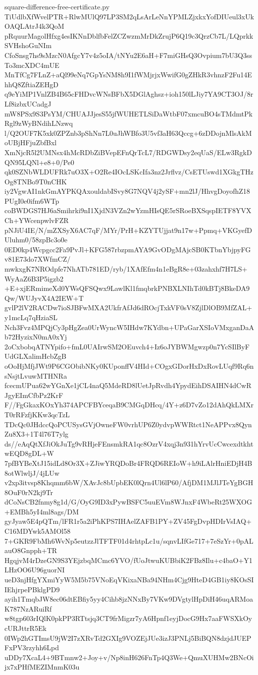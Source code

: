 \documentclass[11pt]{article}
\theoremstyle{definition}
\theoremstyle{remark}
\begin{document}
\begin{filecontents*}[overwrite]{square-difference-free-certificate.py}
TiUdlbXfWvelPTR+RlwMUlQ97LP3SM2qLsArLeNnYPMLZjxkxYofDIUeul3xUkOAQLAtrJ4k3QoM
pRquurMagolHfxg4esIKNnDblfbFelZCZwzmMrDkZrujP6Q19c3QrzCb7L/LQprkkSVHshoGuNIm
CfoSnsg7hs9sMzcN0AfgcY7v4z5oIA/tNYu2E6aH+F7miGHsQ3Ovpium7bU3Q3ssTo3mcXDC4mUE
MnTfCg7FLnZ+aQl99eNq7GpYsNM8h9I1fWMjrjxWwifG0gZHkR3vhnzF2Fu14EhhQ8ZftiaZEHgD
q9eYiMP1VnlZB4B65cFHDvcWNsBFbX5DGlAghsz+ioh150lLJiy7YA9CT3OJ/8rLf8izbxUCadgJ
mW8PSx9S3PsYM/CHUAJJjesS55jfWUHETLSiDaWtbF07xmcuBO4sTMdmtPkRgl9zWyBNdihLNzwq
l/Q2OUF7K5xk0ZPZnb3pShNn7L0uJhWBfo3U5vf3aH63Qccg+6zDDojnMlsAkMoUBjHFjuZbfBxl
XmNjcR5l2UMNsx4hMcRDbZiBVepEFnQrTcL7/RDGWDsy2eqUaS/ELw3RgkDQN95LQNl+e8+0/Pe0
qk0SZNbWLDUFRk7uO3X+O2Re4IOcLSKcIfa3nz2Jrflvz/CsETUswd1XGkgTHzOg8TNBo9T0nCHK
iy2VgwAI1nkGmAYPKQAxouldabISvy8G7NQV4j2ySF+mn2lJ/HhvgDoyofhZ18PUgI0e0ifm6WTp
coBWDGS7HJ6aSmihrki9nI1XjdN3VZn2wYzmHIsQE5rSRoeBXSqspIETF8YVXCh+YWcenpwlvFZR
pNJiU4IE/N/mZXSyX6AC7qF/MYr/PrH+KZYTUjjat9n17w+Ppmq+VKGyefDUluhm0/58zpBc3o0e
0ED0kp4Wcpgcc2Fa9PvJl+KFG587rbzpmAYA9GvODgMAjcSB0KTbnYbjpyFGv81E73do7XWfmCZ/
mwkxgK7NROdpfe7NhATb781ED/ryb/1XAfEfm4n1eBgR8e+03zahxhf7H7LS+WyAaZ6B3P5igzb2
+E+xjERmimeXd0YWsQFSQwx9LawlKl1fmqbrkPNBXLNIhTd0kBTj8BkeDA9Qw/WUJyvX4A2IEW+T
gvlP2lV2RACDw7ioSJBFwMXA2UkfrAfJd6dROcjTxkVF0sV8ZjlDlOB9MfZAL+y1mcLq7qHziaSL
Nch3Fvz4MPQjCy3pHgZea0UrWyncW5IHdw7KYdbn+UPaGarXSIoVMxganDaAb72HyzixN0mA0xYj
2oCxbobqATNYpifo+fmL0UAIrwSM2OEuvch4+Iz6oJYBWMgwzp0n7YcSIlByFUdGLXalimHcbZgB
oOoHjMfjJWt9P6CGObibNKy0KUponffV4HId+COgxGDorHxDxRovLUqf9Rq6nsNsjtLvuwMTHNRa
fcecmUPua62wYGnXe1jCL4naQ5MdeRD8lUetJpRvdh4YpydEihDSAIHN4dCwRJgyEImCfbPz2KrF
F//FgGkaxKOxYh374APCFBYceqaB9CMGqDHcq/4Y+z6D7vZo12dAhQkLMXrT0rRFzfjKKw3qcTzL
TDcQc0JHdccQoPCUSysGVjOwneFW0vrhUP6Z0ydvpWWRtct1NeAPPvx8QynZu8X3+1T4l76T7ylg
ds//eAqQtXfJiOkJuTg9vRHjeFEnsmkRA1qc8OzrV4xqj3n931hYrvUcCwcexdtkhtwEQD8gDL+W
7pfBYBeXtJ15idLd8Or3X+ZJiwYRQDoBr4FRQD6REIoW+h9iLAlrHniEDjH4B8otWlwljJ/4jLUw
v2xp3itvsp8Khqmm6bW/XAvJc8bUpbEK0lQrn4Ul6lP60/AfjDM1MJlJTeYgBGH8OuF0rN2kj9Tr
dCoNsCB2fnmy8g1d/G/OyG9ID3xPywBSFC5uuEVm8WJnxF4WbeRt25WXOG+EMBh5yI4ml8ags/DM
gyJyaw5E4pQTm/lFR1r5a2iPhKPS7IHAelZAFB1PY+ZV45FgDvpHDIrVsIAQ+C16MDYwk5AMOl58
7+GKR9FbMh6WvNp5eutzzJlTFTF01d4rhtpLc1u/sqnvLIfGe717+7eSzYr+0pALauO8Gnpph+TR
HgqjvM4rDzeGN9S3YEjzbqMCmc6YVO/fUoJtwuKUBbiK2FBz8Ilu+c4baO+Y1LHzOO6U96guorNI
ueD3njHfgYXmiYyW5M5b75VNoEqVKixaNBa94NHm4Cjg9HteD4GB1iy8KOsSIIEhjrpePBklgPD9
ayih1TmqbJW8ec06dtEBfiy5yy4Cihb8jzNNxBy7VKw9DVgtylHpDiH46uqARMoaK787NzARuiRf
w8tgp603rIQlK0pkPP3RTtsjq3CT9frMigzr7yA6Hpnf1eyjDocG9Hx7aaFWSXkOycURJttrR5Ek
0IWp2hGTImsU9jW2I7zXRvTd2GXIg9VOZEjJUe3izJ3PNLj5BiBQN8dzjdJUEPFxPV3rzyhh6Lpd
uDDy7XcaL4+9BTmnw2+Joy+v/Np8inH626FnTp4Q3We+QmuXUHMw2BNcOijx7xPHfMEZIMnmK03u

\end{filecontents*}
\end{document}
